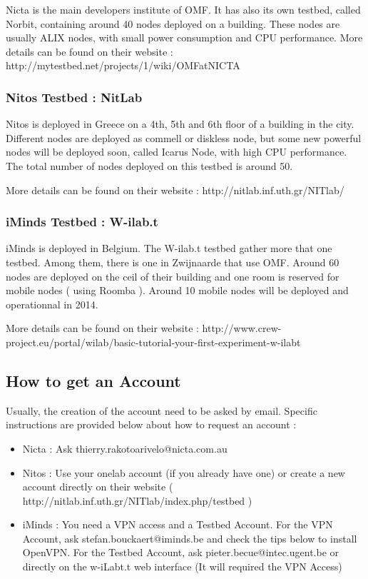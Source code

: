 Nicta is the main developers institute of OMF. It has also its own testbed, called Norbit, containing around 40 nodes deployed on a building. These nodes are usually ALIX nodes, with small power consumption and CPU performance. 
More details can be found on their website : 
http://mytestbed.net/projects/1/wiki/OMFatNICTA

\subsubsection{Nitos Testbed : NitLab}

Nitos is deployed in Greece on a 4th, 5th and 6th floor of a building in the city. Different nodes are deployed as commell or diskless node, but some new powerful nodes will be deployed soon, called Icarus Node, with high CPU performance. The total number of nodes deployed on this testbed is around 50.

More details can be found on their website : 
http://nitlab.inf.uth.gr/NITlab/

\subsubsection{iMinds Testbed : W-ilab.t}

iMinds is deployed in Belgium. The W-ilab.t testbed gather more that one testbed. Among them, there is one in Zwijnaarde that use OMF. Around 60 nodes are deployed on the ceil of their building and one room is reserved for mobile nodes ( using Roomba ). Around 10 mobile nodes will be deployed and operationnal in 2014.

More details can be found on their website : 
http://www.crew-project.eu/portal/wilab/basic-tutorial-your-first-experiment-w-ilabt

\subsection{How to get an Account}

Usually, the creation of the account need to be asked by email. Specific instructions are provided below about how to request an account : 
\begin{itemize}
\item Nicta : Ask thierry.rakotoarivelo@nicta.com.au 
\item Nitos : Use your onelab account (if you already have one) or create a new account directly on their website 
( http://nitlab.inf.uth.gr/NITlab/index.php/testbed )
\item iMinds : You need a VPN access and a Testbed Account. For the VPN Account, ask stefan.bouckaert@iminds.be and check the tips below to install OpenVPN. For the Testbed Account, ask pieter.becue@intec.ugent.be or directly on the w-iLabt.t web interface (It will required the VPN Access)
\end{itemize}

